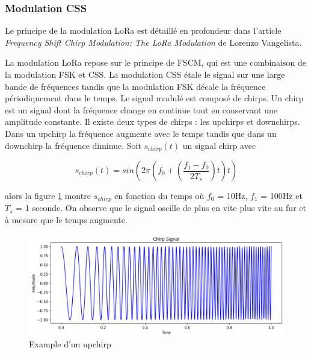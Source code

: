 \subsubsection{Modulation CSS}\label{css}

Le principe de la modulation LoRa est détaillé en profondeur dans l'article \textit{Frequency Shift Chirp Modulation: The LoRa Modulation} \cite{loraCSS} de Lorenzo Vangelista.

\vspace{0.1cm}

La modulation \ac{LoRa} repose sur le principe de \ac{FSCM}, qui est une combinaison de la modulation \ac{FSK} et \ac{CSS}.
La modulation \ac{CSS} étale le signal sur une large bande de fréquences tandis que la modulation \ac{FSK} décale la fréquence périodiquement dans le temps. Le signal modulé est composé de chirps. Un chirp est un signal dont la fréquence change en continue tout en conservant une amplitude constante. Il existe deux types de chirps : les upchirps et downchirps.
Dans un upchirp la fréquence augmente avec le temps tandis que dans un downchirp la fréquence diminue. Soit $s_{chirp}(t)$ un signal chirp avec

\begin{equation}\label{eq3}
s_{chirp}(t) = sin(2\pi(f_0 + (\frac{f_1 - f_0}{2T_s})t)t)
\end{equation}

alors la figure \ref{term5} montre $s_{chirp}$ en fonction du temps où $f_0$ = 10Hz, $f_1$ = 100Hz et $T_s$ = 1 seconde. On observe que le signal oscille de plus en vite plus vite au fur et à mesure que le temps augmente.

\begin{figure}[h]
\centering

\includegraphics[scale=0.18]{images/CSSupchirp.png}
\caption{Example d'un upchirp}\label{term5}
\end{figure}

\vspace{0.1cm}

